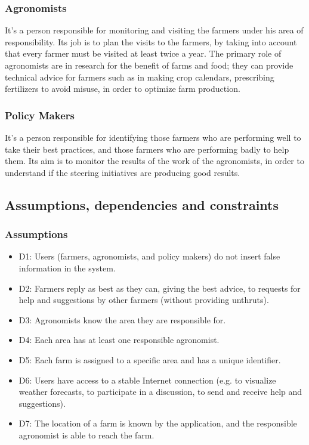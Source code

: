 \documentclass{article}
\begin{document}
\subsubsection{Agronomists}
    It’s a person responsible for monitoring and visiting the farmers under his area of responsibility. Its job is to plan the visits to the farmers, by taking into account that every farmer must be visited at least twice a year. 
    The primary role of agronomists are in research for the benefit of farms and food; they can provide technical advice for farmers such as in making crop calendars, prescribing fertilizers to avoid misuse, in order to optimize farm production.

\subsubsection{Policy Makers}
    It’s a person responsible for identifying those farmers who are performing well to take their best practices, and those farmers who are performing badly to help them. Its aim is to monitor the results of the work of the agronomists, in order to understand if the steering initiatives are producing good results. 


\subsection{Assumptions, dependencies and constraints}

\subsubsection{Assumptions}

    \begin{itemize}
        \item D1: Users (farmers, agronomists, and policy makers) do not insert false information in the system.
        \item D2: Farmers reply as best as they can, giving the best advice, to requests for help and suggestions by other farmers (without providing unthruts).
        \item D3: Agronomists know the area they are responsible for.
        \item D4: Each area has at least one responsible agronomist.
        \item D5: Each farm is assigned to a specific area and has a unique identifier. 
        \item D6: Users have access to a stable Internet connection (e.g. to visualize weather forecasts, to participate in a discussion, to send and receive help and suggestions).
        \item D7: The location of a farm is known by the application, and the responsible agronomist is able to reach the farm.
    \end{itemize}
\end{document}
